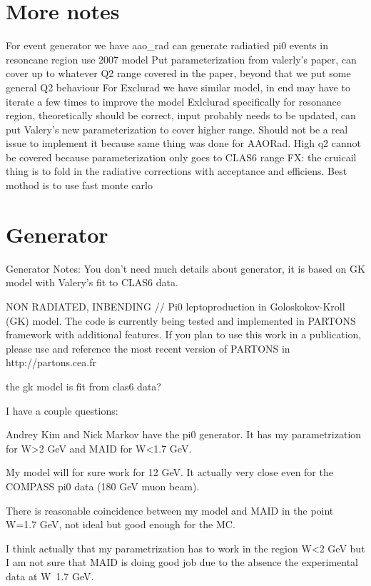 \section{More notes}
    

    For event generator we have aao\_rad can generate radiatied pi0 events in resoncane region use 2007 model
    Put parameterization from valerly’s paper, can cover up to whatever Q2 range covered in the paper, beyond that we put some general Q2 behaviour
    For Exclurad we have similar model, in end may have to iterate a few times to improve the model
    Exlclurad specifically for resonance region, theoretically should be correct, input probably needs to be updated, can put Valery’s new parameterization to cover higher range. Should not be a real issue to implement it because same thing was done for AAORad. High q2 cannot be covered because parameterization only goes to CLAS6 range
    FX: the cruicail thing is to fold in the radiative corrections with acceptance and efficiens. Best mothod is to use fast monte carlo




\section{Generator}
Generator Notes:
You don't need much details about generator, it is based on GK model with Valery's fit to CLAS6 data.

NON RADIATED, INBENDING
// Pi0 leptoproduction in Goloskokov-Kroll (GK) model. The code is currently being tested and implemented in PARTONS framework with additional features. If you plan to use this work in a publication, please use and reference the most recent version of PARTONS in http://partons.cea.fr 

the gk model is fit from clas6 data?

I have a couple questions:

Andrey Kim and Nick Markov have the pi0 generator. It has my parametrization for W>2 GeV and MAID for W<1.7 GeV.

My model will for sure work for 12 GeV. It actually very close even for the COMPASS pi0 data (180 GeV muon beam).

There is reasonable coincidence between my model and MAID in the point W=1.7 GeV, not ideal but good enough for the MC.

I think actually that my parametrization has to work in the region W<2 GeV but I am not sure that MAID is doing good job due to the absence the experimental data at W~1.7 GeV. 






